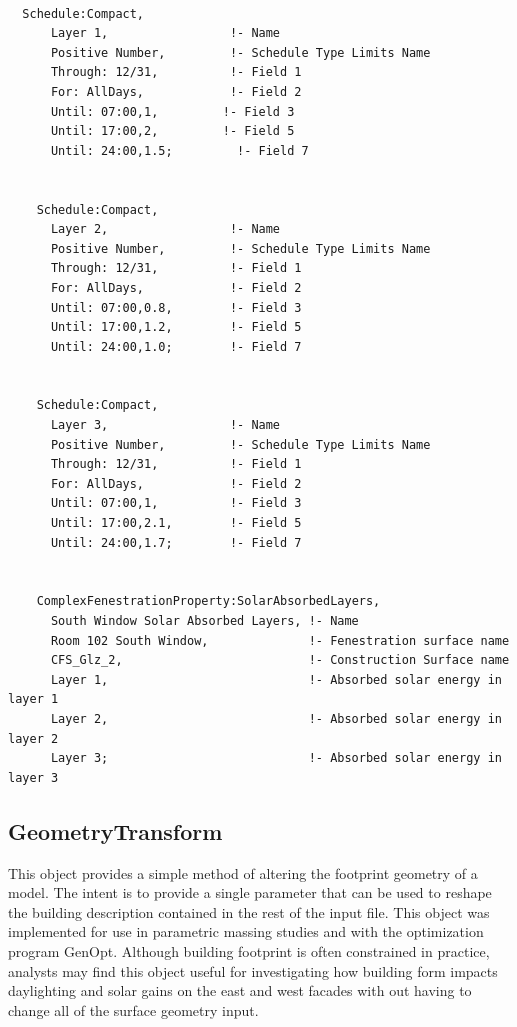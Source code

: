 \begin{lstlisting}

  Schedule:Compact,
      Layer 1,                 !- Name
      Positive Number,         !- Schedule Type Limits Name
      Through: 12/31,          !- Field 1
      For: AllDays,            !- Field 2
      Until: 07:00,1,         !- Field 3
      Until: 17:00,2,         !- Field 5
      Until: 24:00,1.5;         !- Field 7


    Schedule:Compact,
      Layer 2,                 !- Name
      Positive Number,         !- Schedule Type Limits Name
      Through: 12/31,          !- Field 1
      For: AllDays,            !- Field 2
      Until: 07:00,0.8,        !- Field 3
      Until: 17:00,1.2,        !- Field 5
      Until: 24:00,1.0;        !- Field 7


    Schedule:Compact,
      Layer 3,                 !- Name
      Positive Number,         !- Schedule Type Limits Name
      Through: 12/31,          !- Field 1
      For: AllDays,            !- Field 2
      Until: 07:00,1,          !- Field 3
      Until: 17:00,2.1,        !- Field 5
      Until: 24:00,1.7;        !- Field 7


    ComplexFenestrationProperty:SolarAbsorbedLayers,
      South Window Solar Absorbed Layers, !- Name
      Room 102 South Window,              !- Fenestration surface name
      CFS_Glz_2,                          !- Construction Surface name
      Layer 1,                            !- Absorbed solar energy in layer 1
      Layer 2,                            !- Absorbed solar energy in layer 2
      Layer 3;                            !- Absorbed solar energy in layer 3
\end{lstlisting}

\subsection{GeometryTransform}\label{geometrytransform}

This object provides a simple method of altering the footprint geometry of a model. The intent is to provide a single parameter that can be used to reshape the building description contained in the rest of the input file. This object was implemented for use in parametric massing studies and with the optimization program GenOpt. Although building footprint is often constrained in practice, analysts may find this object useful for investigating how building form impacts daylighting and solar gains on the east and west facades with out having to change all of the surface geometry input.

